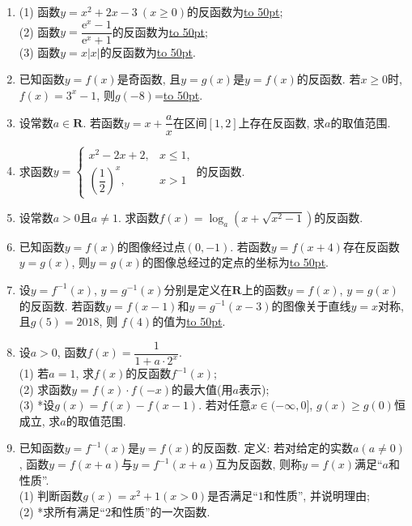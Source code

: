 \documentclass[10pt,a4paper]{article}
\newcommand{\blank}[1]{\underline{\hbox to #1pt{}}}
\begin{document}
\begin{enumerate}[1.]
\item (1) 函数$y=x^2+2x-3\ (x\ge 0)$的反函数为\blank{50};\\
(2) 函数$y=\dfrac{\mathrm{e}^x-1}{{\mathrm{e}}^x+1}$的反函数为\blank{50};\\
(3) 函数$y=x|x|$的反函数为\blank{50}.
\item 已知函数$y=f(x)$是奇函数, 且$y=g(x)$是$y=f(x)$的反函数. 若$x\ge 0$时, $f(x)=3^x-1$, 则$g(-8)$=\blank{50}.
\item 设常数$a\in \mathbf{R}$. 若函数$y=x+\dfrac ax$在区间$[1,2]$上存在反函数, 求$a$的取值范围.
\item 求函数$y=\begin{cases}x^2-2x+2, & x\le 1,\\(\dfrac 12)^x, & x>1  \end{cases}$的反函数.
\item 设常数$a>0$且$a\ne 1$. 求函数$f(x)=\log_a(x+\sqrt{x^2-1})$的反函数.
\item 已知函数$y=f(x)$的图像经过点$(0,-1)$. 若函数$y=f(x+4)$存在反函数$y=g(x)$, 则$y=g(x)$的图像总经过的定点的坐标为\blank{50}.
\item 设$y=f^{-1}(x)$, $y=g^{-1}(x)$分别是定义在$\mathbf{R}$上的函数$y=f(x)$, $y=g(x)$的反函数. 若函数$y=f(x-1)$和$y=g^{-1}(x-3)$的图像关于直线$y=x$对称, 且$g(5)=2018$, 则 $f(4)$的值为\blank{50}.
\item 设$a>0$, 函数$f(x)=\dfrac 1{1+a\cdot 2^x}$.\\
(1) 若$a=1$, 求$f(x)$的反函数$f^{-1}(x)$;\\
(2) 求函数$y=f(x)\cdot f(-x)$的最大值(用$a$表示);\\
(3) *设$g(x)=f(x)-f(x-1)$. 若对任意$x\in (-\infty ,0]$, $g(x)\ge g(0)$恒成立, 求$a$的取值范围.
\item 已知函数$y=f^{-1}(x)$是$y=f(x)$的反函数. 定义: 若对给定的实数$a(a\ne 0)$, 函数$y=f(x+a)$与$y=f^{-1}(x+a)$互为反函数, 则称$y=f(x)$满足``$a$和性质''.\\
(1) 判断函数$g(x)=x^2+1(x>0)$是否满足``$1$和性质'', 并说明理由;\\
(2) *求所有满足``$2$和性质''的一次函数. 


\end{enumerate}
\end{document}
